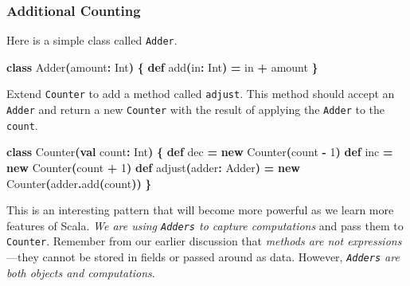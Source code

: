 \documentclass[11pt,a5paper,]{book}
\newenvironment{Shaded}{\begin{snugshade}}{\end{snugshade}}
\newcommand{\BuiltInTok}[1]{#1}
\newcommand{\DecValTok}[1]{\textcolor[rgb]{0.00,0.00,0.81}{#1}}
\newcommand{\FunctionTok}[1]{\textcolor[rgb]{0.00,0.00,0.00}{#1}}
\newcommand{\KeywordTok}[1]{\textcolor[rgb]{0.13,0.29,0.53}{\textbf{#1}}}
\newcommand{\NormalTok}[1]{#1}
\newcommand{\OperatorTok}[1]{\textcolor[rgb]{0.81,0.36,0.00}{\textbf{#1}}}
\begin{document}
\hypertarget{additional-counting}{%
\subsubsection{Additional Counting}\label{additional-counting}}

Here is a simple class called \texttt{Adder}.

\begin{Shaded}
\begin{Highlighting}[]
\KeywordTok{class} \FunctionTok{Adder}\OperatorTok{(}\NormalTok{amount}\OperatorTok{:} \BuiltInTok{Int}\OperatorTok{)} \OperatorTok{\{}
  \KeywordTok{def} \FunctionTok{add}\OperatorTok{(}\NormalTok{in}\OperatorTok{:} \BuiltInTok{Int}\OperatorTok{)} \OperatorTok{=}\NormalTok{ in }\OperatorTok{+}\NormalTok{ amount}
\OperatorTok{\}}
\end{Highlighting}
\end{Shaded}

Extend \texttt{Counter} to add a method called \texttt{adjust}. This
method should accept an \texttt{Adder} and return a new \texttt{Counter}
with the result of applying the \texttt{Adder} to the \texttt{count}.

\begin{Shaded}
\begin{Highlighting}[]
\KeywordTok{class} \FunctionTok{Counter}\OperatorTok{(}\KeywordTok{val}\NormalTok{ count}\OperatorTok{:} \BuiltInTok{Int}\OperatorTok{)} \OperatorTok{\{}
  \KeywordTok{def}\NormalTok{ dec }\OperatorTok{=} \KeywordTok{new} \FunctionTok{Counter}\OperatorTok{(}\NormalTok{count }\OperatorTok{{-}} \DecValTok{1}\OperatorTok{)}
  \KeywordTok{def}\NormalTok{ inc }\OperatorTok{=} \KeywordTok{new} \FunctionTok{Counter}\OperatorTok{(}\NormalTok{count }\OperatorTok{+} \DecValTok{1}\OperatorTok{)}
  \KeywordTok{def} \FunctionTok{adjust}\OperatorTok{(}\NormalTok{adder}\OperatorTok{:}\NormalTok{ Adder}\OperatorTok{)} \OperatorTok{=}
    \KeywordTok{new} \FunctionTok{Counter}\OperatorTok{(}\NormalTok{adder}\OperatorTok{.}\FunctionTok{add}\OperatorTok{(}\NormalTok{count}\OperatorTok{))}
\OperatorTok{\}}
\end{Highlighting}
\end{Shaded}

This is an interesting pattern that will become more powerful as we
learn more features of Scala. \emph{We are using \texttt{Adders} to
capture computations} and pass them to \texttt{Counter}. Remember from
our earlier discussion that \emph{methods are not expressions}---they
cannot be stored in fields or passed around as data. However,
\emph{\texttt{Adders} are both objects and computations}.
\end{document}
